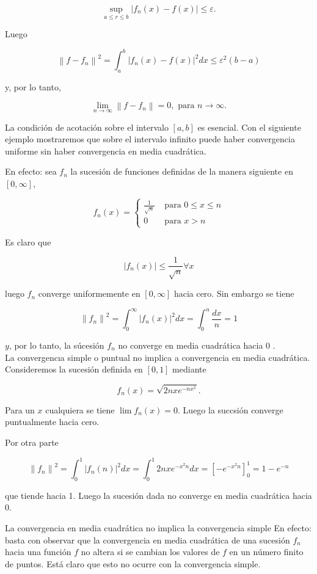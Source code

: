 \documentclass[10pt]{article}
\theoremstyle{plain}
\theoremstyle{definition}
\theoremstyle{remark}
\begin{document}
$$
\sup _{a \leqslant r \leqslant b}\left|f_{n}(x)-f(x)\right| \leqslant \varepsilon .
$$

Luego

$$
\left\|f-f_{n}\right\|^{2}=\int_{a}^{b}\left|f_{n}(x)-f(x)\right|^{2} d x \leqslant \varepsilon^{2}(b-a)
$$

y, por lo tanto,

$$
\lim _{n \rightarrow \infty}\left\|f-f_{n}\right\|=0, \text { para } n \rightarrow \infty .
$$

La condición de acotación sobre el intervalo $[a, b]$ es esencial. Con el siguiente ejemplo mostraremos que sobre el intervalo infinito puede haber convergencia uniforme sin haber convergencia en media cuadrática.

En efecto: sea $f_{n}$ la sucesión de funciones definidas de la manera siguiente en $[0, \infty]$,

$$
f_{n}(x)=\left\{\begin{array}{cc}
\frac{1}{\sqrt{n}} & \text { para } 0 \leqslant x \leqslant n \\
0 & \text { para } x>n
\end{array}\right.
$$

Es claro que

$$
\left|f_{n}(x)\right| \leqslant \frac{1}{\sqrt{n}} \forall x
$$

luego $f_{n}$ converge uniformemente en $[0, \infty]$ hacia cero. Sin embargo se tiene

$$
\left\|f_{n}\right\|^{2}=\int_{0}^{\infty}\left|f_{n}(x)\right|^{2} d x=\int_{0}^{n} \frac{d x}{n}=1
$$

$y$, por lo tanto, la súcesión $f_{n}$ no converge en media cuadrática hacia 0 .\\
La convergencıa simple o puntual no implica a convergencia en media cuadrática. Consideremos la sucesión definida en $[0,1]$ mediante


$$
f_{n}(x)=\sqrt{2 n x e^{-n x^{2}}} .
$$

Para un $x$ cualquiera se tiene $\lim f_{n}(x)=0$. Luego la succsión converge puntualmente hacia cero.

Por otra parte

$$
\left\|f_{n}\right\|^{2}=\int_{0}^{1}\left|f_{n}(n)\right|^{2} d x=\int_{0}^{1} 2 n x e^{-x^{2} n} d x=\left[-e^{-x^{2} n}\right]_{0}^{1}=1-e^{-n}
$$

que tiende hacia 1. Luego la sucesión dada no converge en media cuadrática hacia 0.

La convergencia en media cuadrática no implica la convergencia simple En efecto: basta con observar que la convergencia en media cuadrática de una sucesión $f_{n}$ hacia una función $f$ no altera si se cambian los valores de $f$ en un número finito de puntos. Está claro que esto no ocurre con la convergencia simple.
\end{document}
